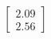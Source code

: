 \documentclass[preview]{standalone}
\begin{document}
\begin{align*}
\begin{bmatrix} 2.09 \\ 2.56 \end{bmatrix}
\end{align*}
\end{document}
